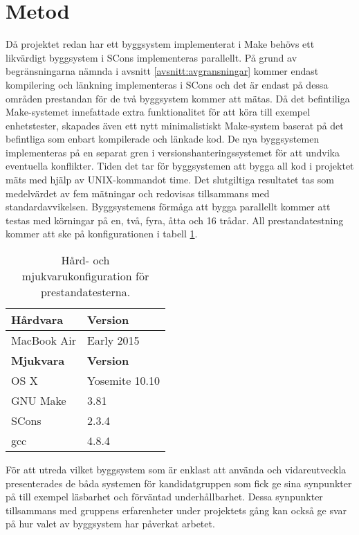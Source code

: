 \section{Metod} \label{avsnitt:metod}
Då projektet redan har ett byggsystem implementerat i Make behövs ett likvärdigt byggsystem i SCons implementeras parallellt. På grund av begränsningarna nämnda i avsnitt \ref{avsnitt:avgransningar} kommer endast kompilering och länkning implementeras i SCons och det är endast på dessa områden prestandan för de två byggsystem kommer att mätas. Då det befintiliga Make-systemet innefattade extra funktionalitet för att köra till exempel enhetstester, skapades även ett nytt minimalistiskt Make-system baserat på det befintliga som enbart kompilerade och länkade kod. De nya byggsystemen implementeras på en separat gren i versionshanteringssystemet för att undvika eventuella konflikter.
\newline
\newline
Tiden det tar för byggsystemen att bygga all kod i projektet mäts med hjälp av UNIX-kommandot time. Det slutgiltiga resultatet tas som medelvärdet av fem mätningar och redovisas tillsammans med standardavvikelsen. Byggsystemens förmåga att bygga parallellt kommer att testas med körningar på en, två, fyra, åtta och 16 trådar.
\newline
\newline
All prestandatestning kommer att ske på konfigurationen i tabell \ref{tabell:konfig}.

\begin{table}[h!]
  \centering
  \begin{tabular}{|l|l|}
    \hline
    \textbf{Hårdvara} & \textbf{Version} \\ \hline
    MacBook Air & Early 2015 \\ \hline
    \textbf{Mjukvara} & \textbf{Version} \\ \hline
    OS X & Yosemite 10.10 \\ \hline
    GNU Make & 3.81 \\ \hline
    SCons & 2.3.4 \\ \hline
    gcc & 4.8.4 \\ \hline
  \end{tabular}
  \caption{Hård- och mjukvarukonfiguration för prestandatesterna.}
  \label{tabell:konfig}
\end{table}

För att utreda vilket byggsystem som är enklast att använda och vidareutveckla presenterades de båda systemen för kandidatgruppen som fick ge sina synpunkter på till exempel läsbarhet och förväntad underhållbarhet. Dessa synpunkter tillsammans med gruppens erfarenheter under projektets gång kan också ge svar på hur valet av byggsystem har påverkat arbetet.
